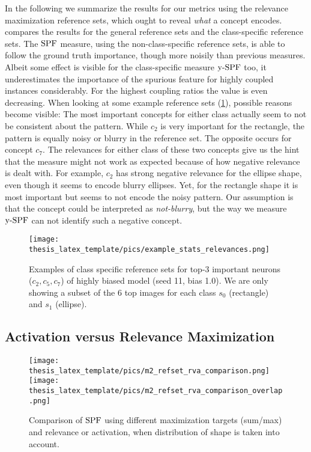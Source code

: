 In the following we summarize the results for our metrics using the relevance maximization reference sets, which ought to reveal \textit{what} a concept encodes.  compares the results for the general reference sets and the class-specific reference sets. 
The $\operatorname*{SPF}$ measure, using the non-class-specific reference sets, is able to follow the ground truth importance, though more noisily than previous measures. 
Albeit some effect is visible for the class-specific measure $\operatorname*{y-SPF}$ too, it underestimates the importance of the spurious feature for highly coupled instances considerably. For the highest coupling ratios the value is even decreasing. 
When looking at some example reference sets (\cref{fig:class_reference_sets}), possible reasons become visible: The most important concepts for either class actually seem to not be consistent about the pattern. While $c_2$ is very important for the rectangle, the pattern is equally noisy or blurry in the reference set. The opposite occurs for concept $c_7$. The relevances for either class of these two concepts give us the hint that the measure might not work as expected because of how negative relevance is dealt with. For example, $c_2$ has strong negative relevance for the ellipse shape, even though it seems to encode blurry ellipses. Yet, for the rectangle shape it is most important but seems to not encode the noisy pattern. Our assumption is that the concept could be interpreted as \textit{not-blurry}, but the way we measure $\operatorname*{y-SPF}$ can not identify such a negative concept.

\begin{figure}[t!]
    \centering
    \texttt{[image: thesis\_latex\_template/pics/example\_stats\_relevances.png]}
    \caption{Examples of class specific reference sets for top-3 important neurons ($c_2, c_5, c_7$) of highly biased model (seed 11, bias 1.0). We are only showing a subset of the 6 top images for each class $s_0$ (rectangle) and $s_1$ (ellipse).}
    \label{fig:class_reference_sets}
\end{figure}

\subsection{Activation versus Relevance Maximization}
\begin{figure}[ht!]
    \centering
    \texttt{[image: thesis\_latex\_template/pics/m2\_refset\_rva\_comparison.png]}
    \texttt{[image: thesis\_latex\_template/pics/m2\_refset\_rva\_comparison\_overlap.png]}
    \caption[Reference Sets, Relevance/Activation, Sum/Max ]{
    Comparison of $\operatorname*{SPF}$ using different maximization targets (sum/max) and relevance or activation, when distribution of shape is taken into account.
    }
    \label{fig:m2_refset_rel_vs_act}
\end{figure}

